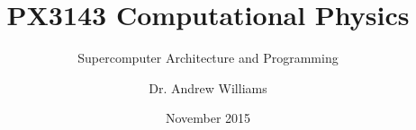 \documentclass{beamer}
\begin{document}
\title[HPC]
{PX3143 Computational Physics}
\subtitle{Supercomputer Architecture and Programming}
\author[Andrew]
{Dr. Andrew Williams}
\date[PX3143]
{November 2015}
\subject{Physics and Astronomy}
\frame{\titlepage}
\end{document}
